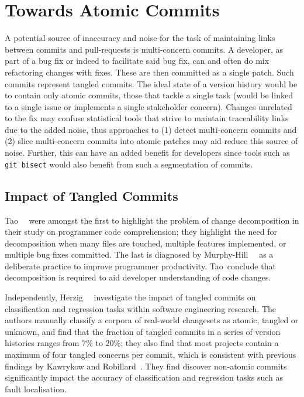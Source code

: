 \section{Towards Atomic Commits}
\label{chapter:literature:sec:flexeme_rel_work}

A potential source of inaccuracy and noise for the task of maintaining links
between commits and pull-requests is multi-concern commits. A developer, as part
of a bug fix or indeed to facilitate said bug fix, can and often do mix
refactoring changes with fixes. These are then committed as a single
patch. Such commits represent tangled commits. The ideal state of a version
history would be to contain only atomic commits, \ie those that tackle a single
task (would be linked to a single issue or implements a single stakeholder
concern). Changes unrelated to the fix may confuse statistical tools that strive
to maintain traceability links due to the added noise, thus approaches to (1)
detect multi-concern commits and (2) slice multi-concern commits into atomic
patches may aid reduce this source of noise. Further, this can have an added
benefit for developers since tools such as \lstinline+git bisect+ would also
benefit from such a segmentation of commits.

\subsection{Impact of Tangled Commits}
\label{chapter:literature:sec:flexeme_rel_work:impact}

Tao~\etal~\cite{Tao2012} were amongst the first to highlight the problem of
change decomposition in their study on programmer code comprehension; they
highlight the need for decomposition when many files are touched, multiple
features implemented, or multiple bug fixes committed. The last is diagnosed by
Murphy-Hill~\etal~\cite{Murphy-Hill2012} as a deliberate practice to improve
programmer productivity. Tao~\etal conclude that decomposition is required to
aid developer understanding of code changes.

Independently, Herzig~\etal~\cite{Herzig2013, Herzig2016} investigate the impact
of tangled commits on classification and regression tasks within software
engineering research. The authors manually classify a corpora of real-world
changesets as atomic, tangled or unknown, and find that the fraction of tangled
commits in a series of version histories ranges from 7\% to 20\%; they also find
that most projects contain a maximum of four tangled concerns per commit, which
is  consistent with previous findings by Kawrykow and
Robillard~\cite{Kawrykow2011}. They find discover non-atomic commits
significantly impact the accuracy of classification and regression tasks such as
fault localisation.

